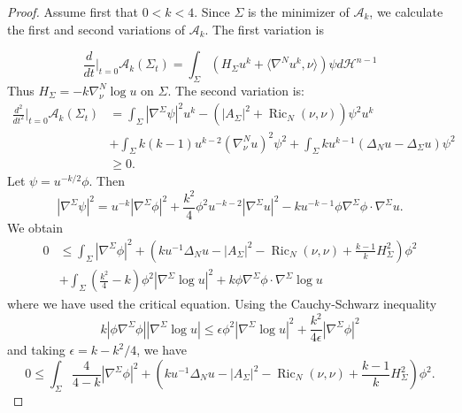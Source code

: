 \documentclass[11pt]{amsart}
\DeclareMathOperator{\Ric}{Ric}
\newcommand{\lp}{\langle}
\newcommand{\rp}{\rangle}
\newcommand{\mA}{\mathcal{A}}
\newcommand{\mH}{\mathcal{H}}
\theoremstyle{definition}
\theoremstyle{remark}
\numberwithin{equation}{section}
\begin{document}
\begin{proof}
    Assume first that $0<k<4$.
    Since $\Sigma$ is the minimizer of $\mA_{k}$, we calculate the first and second variations of
      $\mA_{k}$. The first variation is
  
       \begin{equation*}
        \frac{d}{d t}\bigg|_{t=0}\mA_{k}(\Sigma_t)=\int_{\Sigma}\left(H_\Sigma
          u^k+\lp\nabla^{N}u^k,\nu\rp\right)\psi d\mH^{n-1}
    \end{equation*}
    Thus $H_\Sigma=-k \nabla^N_\nu\log u$ on $\Sigma$. 
    The second variation is:
    \begin{equation*}
        \begin{split}
            \frac{d^2}{d t^2}\bigg|_{t=0}\mA_{k}(\Sigma_t)&=\int_{\Sigma}|\nabla^{\Sigma}\psi|^2
              u^k-\left(|A_{\Sigma}|^2+\Ric_N(\nu,\nu)\right)\psi^2 u^k\\
            &+\int_\Sigma k(k-1)u^{k-2}\left(\nabla^N_{\nu}u\right)^2\psi^2
              +\int_{\Sigma}ku^{k-1}\left(\Delta_N u-\Delta_{\Sigma} u\right)\psi^2\\
            &\geq 0.
        \end{split}
    \end{equation*}
    Let $\psi=u^{-k/2}\phi$. 
    Then
    \[|\nabla^{\Sigma}\psi|^2
      =u^{-k}|\nabla^\Sigma\phi|^2+\frac{k^2}{4}\phi^2u^{-k-2}|\nabla^\Sigma
      u|^2-ku^{-k-1}\phi\nabla^\Sigma\phi\cdot\nabla^\Sigma u.\]
    We obtain
    \begin{equation}\label{A_k-stability inequality}
    \begin{split}
        0&\leq \int_\Sigma |\nabla^\Sigma \phi|^2+(ku^{-1}\Delta_N
          u-|A_\Sigma|^2-\Ric_N(\nu,\nu)+\frac{k-1}{k}H_{\Sigma}^2)\phi^2\\
        & +\int_\Sigma (\frac{k^2}{4}-k)\phi^2|\nabla^\Sigma \log
          u|^2+k\phi\nabla^\Sigma\phi\cdot\nabla^\Sigma\log u
    \end{split}
    \end{equation}
    where we have used the critical equation. Using the Cauchy-Schwarz inequality
    \begin{equation}\label{cauchy ineq}
    k|\phi \nabla^\Sigma\phi||\nabla^\Sigma\log u|\leq \epsilon \phi^2|\nabla^\Sigma \log
      u|^2+\frac{k^2}{4\epsilon}|\nabla^\Sigma \phi|^2
    \end{equation}
    and taking $\epsilon=k-k^2/4$, we have
    \[0\leq \int_\Sigma \frac{4}{4-k}|\nabla^\Sigma\phi|^2+(ku^{-1}\Delta_N
      u-|A_\Sigma|^2-\Ric_N(\nu,\nu)+\frac{k-1}{k}H_{\Sigma}^2)\phi^2.\]
    

\end{proof}
\end{document}
